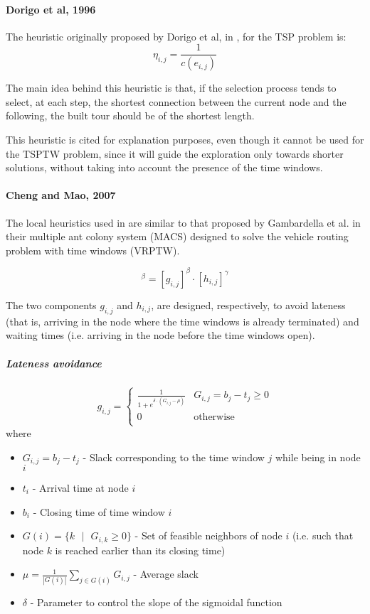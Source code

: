 \begin{homeworkProblem}
\paragraph{Dorigo et al, 1996}
The heuristic originally proposed by Dorigo et al, in \cite{dorigo1996ant}, for the TSP problem is:
\begin{equation}
  \eta_{i,j} = \frac{1}{c(e_{i,j})}
\end{equation}

The main idea behind this heuristic is that, if the selection process tends to select, at each step, the shortest connection between the current node and the following, the built tour should be of the shortest length.

This heuristic is cited for explanation purposes, even though it cannot be used for the TSPTW problem, since it will guide the exploration only towards shorter solutions, without taking into account the presence of the time windows.

\paragraph{Cheng and Mao, 2007}
The local heuristics used in \cite{cheng2007modified} are similar to that proposed by Gambardella et al. \cite{gambardella1999macs} in their multiple ant colony system (MACS) designed to solve the vehicle routing problem with time windows (VRPTW).

\begin{equation}
[\eta_{i,j}]^\beta = [g_{i,j}]^\beta \cdot [h_{i,j}]^\gamma
\end{equation}  

The two components $g_{i,j}$ and $h_{i,j}$, are designed, respectively, to avoid lateness (that is, arriving in the node where the time windows is already terminated) and waiting times (i.e. arriving in the node before the time windows open).

\subparagraph{Lateness avoidance}
\begin{equation}
g_{i,j} = \begin{cases}
 \frac{1}{1+e^{\delta \cdot (G_{i,j} - \mu)}}  &  G_{i,j} = b_j - t_j \geq 0 \\
0 & \text{otherwise} \\
\end{cases}
\end{equation}
where
\begin{itemize}
  \item $G_{i,j} = b_j - t_j$ - Slack corresponding to the time window $j$ while being in node $i$
  \item $t_i$ - Arrival time at node $i$
  \item $b_i$ - Closing time of time window $i$
  \item $G(i) = \{k\text{ } | \text{ }G_{i,k} \geq 0\}$ - Set of feasible neighbors of node $i$ (i.e. such that node $k$ is reached earlier than its closing time)
  \item $\mu = \frac{1}{|G(i)|}\sum_{j \in G(i)}  G_{i,j}$ - Average slack 
  \item $\delta$ - Parameter to control the slope of the sigmoidal function
\end{itemize}


\end{homeworkProblem}
